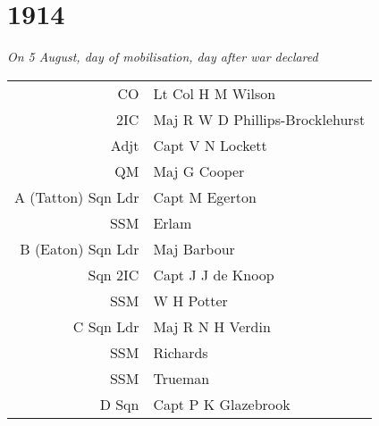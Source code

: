 \chapter*{1914}

\vspace*{10mm}

\begin{center}
  \textit{On 5 August, day of mobilisation, day after war declared}
\end{center}

\vspace*{10mm}

\begin{center}
  \begin{tabular}{rl}
    CO & Lt Col H M Wilson \\
    2IC & Maj R W D Phillips-Brocklehurst\footnotemark \\
    Adjt & Capt V N Lockett \\
    QM & Maj G Cooper \\
    A (Tatton) Sqn Ldr & Capt M Egerton \\
    SSM & Erlam\footnotemark \\
    B (Eaton) Sqn Ldr & Maj Barbour \\
    Sqn 2IC & Capt J J de Knoop \\
    SSM & W H Potter\footnotemark \\
    C Sqn Ldr & Maj R N H Verdin\footnotemark \\
    SSM & Richards \\
    SSM & Trueman\footnotemark \\
    D Sqn & Capt P K Glazebrook \\
  \end{tabular}
\end{center}

